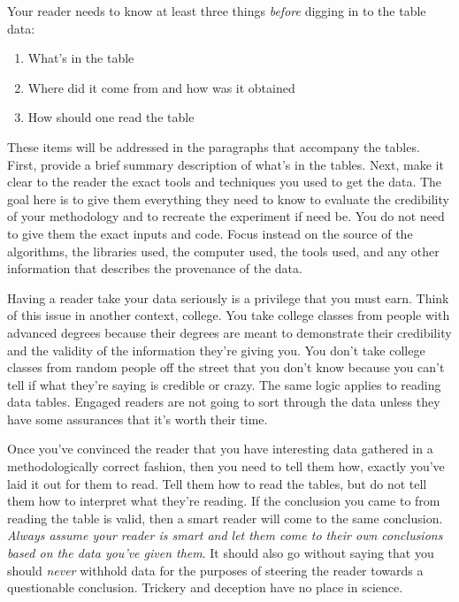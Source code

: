 \documentclass[]{tufte-handout}
\begin{document}
Your reader needs to know at least three things \textit{before} digging in to the table data:
\begin{enumerate}
\item What's in the table
\item Where did it come from and how was it obtained
\item How should one read the table
\end{enumerate}
These items will be addressed in the paragraphs that accompany the tables. First, provide a brief summary description of what's in the tables. Next, make it clear to the reader the exact tools and techniques you used to get the data. The goal here is to give them everything they need to know to evaluate the credibility of your methodology and to recreate the experiment if need be.  You do not need to give them the exact inputs and code. Focus instead on the source of the algorithms, the libraries used, the computer used, the tools used, and any other information that describes the provenance of the data. 

Having a reader take your data seriously is a privilege that you must earn. Think of this issue in another context, college. You take college classes from people with advanced degrees because their degrees are meant to demonstrate their credibility and the validity of the information they're giving you. You don't take college classes from random people off the street that you don't know because you can't tell if what they're saying is credible or crazy. The same logic applies to reading data tables. Engaged readers are not going to sort through the data unless they have some assurances that it's worth their time. 

Once you've convinced the reader that you have interesting data gathered in a methodologically correct fashion, then you need to tell them how, exactly you've laid it out for them to read. Tell them how to read the tables, but do not tell them how to interpret what they're reading. If the conclusion you came to from reading the table is valid, then a smart reader will come to the same conclusion.  \textit{Always assume your reader is smart and let them come to their own conclusions based on the data you've given them}. It should also go without saying that you should \textit{never} withhold data for the purposes of steering the reader towards a questionable conclusion. Trickery and deception have no place in science. 
\end{document}
